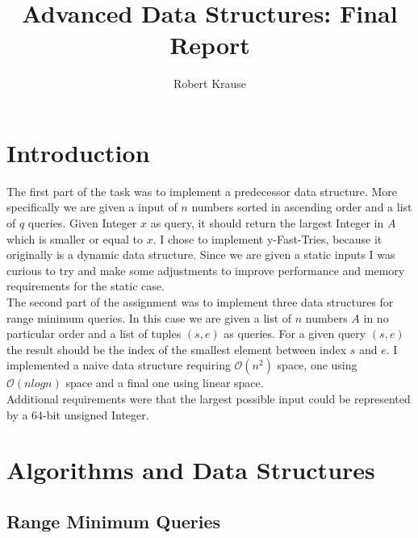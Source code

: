 \documentclass[a4paper,UKenglish,cleveref, autoref, thm-restate]{lipics-v2021}
\title{Advanced Data Structures: Final Report}
\author{Robert Krause}{Matrikelnummer: 2116165}{uflfu@student.kit.edu}{}{}
\begin{document}
\maketitle

\section{Introduction}
The first part of the task was to implement a predecessor data structure. More specifically we are given a 
input of $n$ numbers sorted in ascending order and a list of $q$ queries. Given Integer $x$ as query, it 
should return the largest Integer in $A$ which is smaller or equal to $x$. I chose to implement y-Fast-Tries, 
because it originally is a dynamic data structure. Since we are given a static inputs I was curious to try 
and make some adjustments to improve performance and memory requirements for the static case.\\
The second part of the assignment was to implement three data structures for range minimum queries. In this 
case we are given a list of $n$ numbers $A$ in no particular order and a list of tuples $(s,e)$ as queries. 
For a given query $(s,e)$ the result should be the index of the smallest element between index $s$ and $e$. 
I implemented a naive data structure requiring $\mathcal{O}(n^2)$ space, one using $\mathcal{O}(nlogn)$ 
space and a final one using linear space.\\
Additional requirements were that the largest possible input could be represented by a 64-bit unsigned 
Integer.

\section{Algorithms and Data Structures}
\subsection{Range Minimum Queries}
\end{document}
